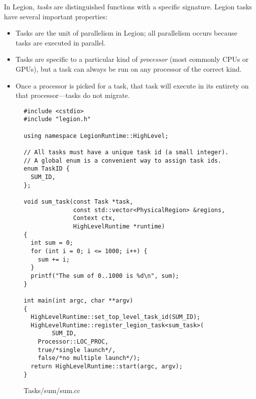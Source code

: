 \documentclass[11pt]{book}
\begin{document}
In Legion, {\em tasks} are distinguished functions with a specific signature.
Legion tasks have several important properties:
\begin{itemize}
\item Tasks are the unit of parallelism in Legion; all parallelism occurs because tasks are executed in parallel.

\item Tasks are specific to a particular kind of {\em processor} (most commonly CPUs or GPUs), but a task can always be run on any processor
of the correct kind.

\item Once a processor is picked for a task, that task will execute in its entirety on that processor---tasks do
not migrate.  

\end{itemize}


\begin{figure}
\begin{lstlisting}
#include <cstdio>
#include "legion.h"

using namespace LegionRuntime::HighLevel;

// All tasks must have a unique task id (a small integer).
// A global enum is a convenient way to assign task ids.
enum TaskID {
  SUM_ID,
};

void sum_task(const Task *task,
              const std::vector<PhysicalRegion> &regions,
              Context ctx, 
              HighLevelRuntime *runtime)
{
  int sum = 0;
  for (int i = 0; i <= 1000; i++) {
    sum += i;
  }
  printf("The sum of 0..1000 is %d\n", sum);
}

int main(int argc, char **argv)
{
  HighLevelRuntime::set_top_level_task_id(SUM_ID);
  HighLevelRuntime::register_legion_task<sum_task>(
        SUM_ID,
	Processor::LOC_PROC, 
	true/*single launch*/, 
	false/*no multiple launch*/);
  return HighLevelRuntime::start(argc, argv);
}
\end{lstlisting}
\caption{Tasks/sum/sum.cc}
\label{fig:simple}
\end{figure}
\end{document}
